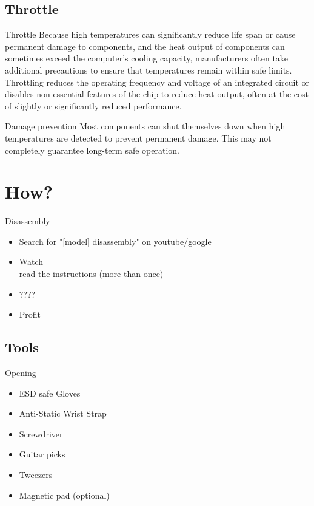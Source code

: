 \documentclass{beamer}
\begin{document}
\subsection{Throttle}
\begin{frame}{Throttle}
    Because high temperatures can significantly reduce life span or cause permanent damage to components, and the heat output of components can sometimes exceed the computer's cooling capacity, manufacturers often take additional precautions to ensure that temperatures remain within safe limits.
    \newline
    \newline
    Throttling reduces the operating frequency and voltage of an integrated circuit or disables non-essential features of the chip to reduce heat output, often at the cost of slightly or significantly reduced performance.
\end{frame}

\begin{frame}{Damage prevention}
    Most components can shut themselves down when high temperatures are detected to prevent permanent damage.
    \newline
    \newline
    This may not completely guarantee long-term safe operation.
\end{frame}

\section{How?}

\begin{frame}{Disassembly}
    \begin{itemize}
        \item Search for "[model] disassembly" on youtube/google
        \item Watch\\read the instructions (more than once)
        \item ????
        \item Profit
    \end{itemize}
\end{frame}

\subsection{Tools}

\begin{frame}{Opening}
    \begin{itemize}
        \item ESD safe Gloves
        \item Anti-Static Wrist Strap
        \item Screwdriver
        \item Guitar picks
        \item Tweezers
        \item Magnetic pad (optional)
    \end{itemize}
\end{frame}
\end{document}
